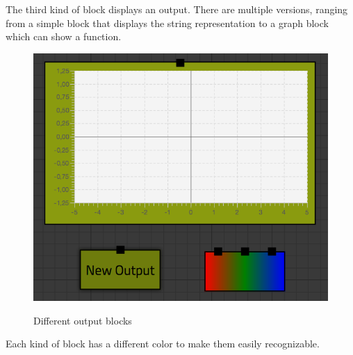 The third kind of block displays an output.
There are multiple versions, ranging from a simple block that displays the string representation to a graph block which can show a function.

\begin{figure}[p]
	\centering
	\includegraphics[scale=0.5]{Images/blocks-outputs}
	\label{fig:blocks-outputs}
	\caption{Different output blocks}
\end{figure}

Each kind of block has a different color to make them easily recognizable.

